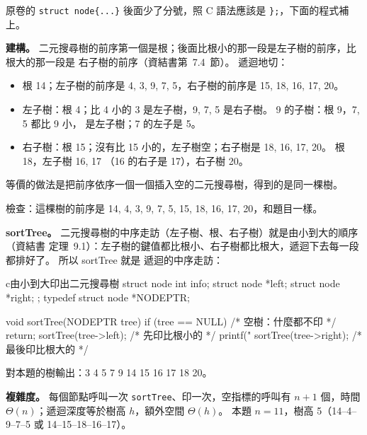 \begin{pastsoln}
原卷的 \texttt{struct node\{...\}} 後面少了分號，照 C 語法應該是 \texttt{\};}，下面的程式補上。

\textbf{建構。} 二元搜尋樹的前序第一個是根；後面比根小的那一段是左子樹的前序，比根大的那一段是
右子樹的前序（資結書第~7.4~節）。 遞迴地切：
\begin{itemize}
\item 根 14；左子樹的前序是 4, 3, 9, 7, 5，右子樹的前序是 15, 18, 16, 17, 20。
\item 左子樹：根 4；比 4 小的 3 是左子樹，9, 7, 5 是右子樹。 9 的子樹：根 9，7, 5 都比 9 小，
是左子樹；7 的左子是 5。
\item 右子樹：根 15；沒有比 15 小的，左子樹空；右子樹是 18, 16, 17, 20。 根 18，左子樹 16, 17
（16 的右子是 17），右子樹 20。
\end{itemize}
等價的做法是把前序依序一個一個插入空的二元搜尋樹，得到的是同一棵樹。
\begin{center}
\end{center}
檢查：這棵樹的前序是 14, 4, 3, 9, 7, 5, 15, 18, 16, 17, 20，和題目一樣。

\textbf{sortTree。} 二元搜尋樹的中序走訪（左子樹、根、右子樹）就是由小到大的順序（資結書
定理~9.1）：左子樹的鍵值都比根小、右子樹都比根大，遞迴下去每一段都排好了。 所以 sortTree 就是
遞迴的中序走訪：

\begin{code}{c}{由小到大印出二元搜尋樹}
struct node{
    int info;
    struct node *left;
    struct node *right;
};
typedef struct node *NODEPTR;

void sortTree(NODEPTR tree){
    if (tree == NULL)           /* 空樹：什麼都不印 */
        return;
    sortTree(tree->left);       /* 先印比根小的 */
    printf("%
    sortTree(tree->right);      /* 最後印比根大的 */
}
\end{code}

對本題的樹輸出：3 4 5 7 9 14 15 16 17 18 20。

\textbf{複雜度。} 每個節點呼叫一次 \texttt{sortTree}、印一次，空指標的呼叫有 $n+1$ 個，時間
$\Theta(n)$；遞迴深度等於樹高 $h$，額外空間 $\Theta(h)$。 本題 $n = 11$，樹高 5（14--4--9--7--5
或 14--15--18--16--17）。
\end{pastsoln}
